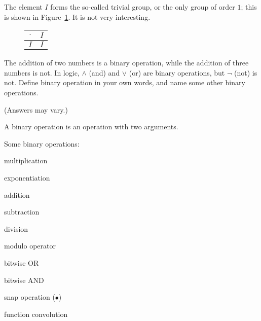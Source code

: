 \documentclass[../key.tex]{subfiles}
\begin{document}
\noindent The element $I$ forms the so-called trivial group, or the only group of order $1$; this is shown in Figure~\ref{fig:trivial_group}. It is not very interesting.

\begin{figure}[h]
	\begin{center}
		\begin{minipage}[b]{\textwidth}
			\centering
			\begin{tabular}{c|c}
				\hline
				$\cdot$ & $I$ \\ \hline
				\rowcolor{light-gray}
				$I$ & $I$ \\ \hline
			\end{tabular}
			\vspace*{0.5\baselineskip}
		\end{minipage}
	\end{center}
	\vspace*{-2\baselineskip}
	\begin{center}
		\begin{minipage}[t]{\textwidth}
			\label{fig:trivial_group}
		\end{minipage}
	\end{center}
	\vspace*{-2\baselineskip}
\end{figure}

\begin{outer_problem}
\item The addition of two numbers is a binary operation, while the addition of three numbers is not. In logic, $\land$ (and) and $\lor$ (or) are binary operations, but $\lnot$ (not) is not. Define binary operation in your own words, and name some other binary operations.
\end{outer_problem}

\noindent (Answers may vary.)

A binary operation is an operation with two arguments.

Some binary operations:
\begin{enumerate}
\begin{multicols}{4}
\item multiplication
\item exponentiation
\item addition
\item subtraction
\item division
\item modulo operator
\item bitwise OR
\item bitwise AND
\item snap operation ($\bullet$)
\item function convolution
\end{multicols}
\end{enumerate}
\end{document}
